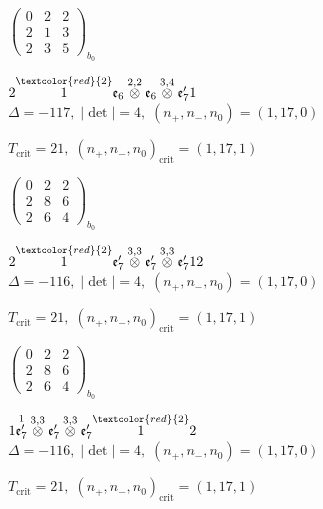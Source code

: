 \documentclass[10pt]{article}
\begin{document}
\hspace{2em}$\left(\begin{smallmatrix}0 & 2 & 2 \\ 2 & 1 & 3 \\ 2 & 3 & 5\end{smallmatrix}\right)_{\!b_0}$

\smallskip

$2\overset{\textcolor{red}{2}}{1}\mathfrak{e}_6\overset{2,2}{\otimes}\mathfrak{e}_6\overset{3,4}{\otimes}\mathfrak{e}_7'1$ \quad $\Delta=-117,\; |\det|=4,\; (n_+,n_-,n_0)=(1,17,0)$

\hspace{1em}$T_{\text{crit}}=21,\; (n_+,n_-,n_0)_{\text{crit}}=(1,17,1)$

\hspace{2em}$\left(\begin{smallmatrix}0 & 2 & 2 \\ 2 & 8 & 6 \\ 2 & 6 & 4\end{smallmatrix}\right)_{\!b_0}$

\smallskip

$2\overset{\textcolor{red}{2}}{1}\mathfrak{e}_7'\overset{3,3}{\otimes}\mathfrak{e}_7'\overset{3,3}{\otimes}\mathfrak{e}_7'12$ \quad $\Delta=-116,\; |\det|=4,\; (n_+,n_-,n_0)=(1,17,0)$

\hspace{1em}$T_{\text{crit}}=21,\; (n_+,n_-,n_0)_{\text{crit}}=(1,17,1)$

\hspace{2em}$\left(\begin{smallmatrix}0 & 2 & 2 \\ 2 & 8 & 6 \\ 2 & 6 & 4\end{smallmatrix}\right)_{\!b_0}$

\smallskip

$1\overset{1}{\mathfrak{e}_7'}\overset{3,3}{\otimes}\mathfrak{e}_7'\overset{3,3}{\otimes}\mathfrak{e}_7'\overset{\textcolor{red}{2}}{1}2$ \quad $\Delta=-116,\; |\det|=4,\; (n_+,n_-,n_0)=(1,17,0)$

\hspace{1em}$T_{\text{crit}}=21,\; (n_+,n_-,n_0)_{\text{crit}}=(1,17,1)$
\end{document}

